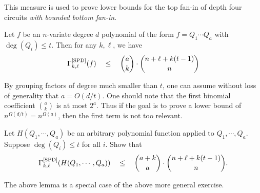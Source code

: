 
This measure is used to prove lower bounds for the top fan-in of depth four circuits \emph{with bounded bottom fan-in}. 

\begin{lemma*}
Let $f$ be an $n$-variate degree $d$ polynomial of the form $f = Q_1 \cdots Q_a$ with $\deg(Q_i) \leq t$. Then for any $k,\ell$, we have
\[
\Gamma^{\mathrm{[SPD]}}_{k,\ell}(f) \quad \leq \quad \binom{a}{k} \cdot \binom{n + \ell + k(t-1)}{n}
\]
\end{lemma*}

By grouping factors of degree much smaller than $t$, one can assume without loss of generality that $a = O(d/t)$.
One should note that the first binomial coefficient $\binom{a}{k}$ is at most $2^a$.
Thus if the goal is to prove a lower bound of $n^{\Omega(d/t)} = n^{\Omega(a)}$, then the first term is not too relevant. \\

\begin{exercise}
Let $H(Q_1,\cdots, Q_a)$ be an arbitrary polynomial function applied to $Q_1,\cdots, Q_a$. Suppose $\deg(Q_i) \leq t$ for all $i$. Show that
\[
\Gamma^{\mathrm{[SPD]}}_{k,\ell}(H(Q_1,\cdots, Q_a)) \quad \leq \quad \binom{a+k}{a} \cdot \binom{n + \ell + k(t-1)}{n}.
\]
\end{exercise}

The above lemma is a special case of the above more general exercise. 

